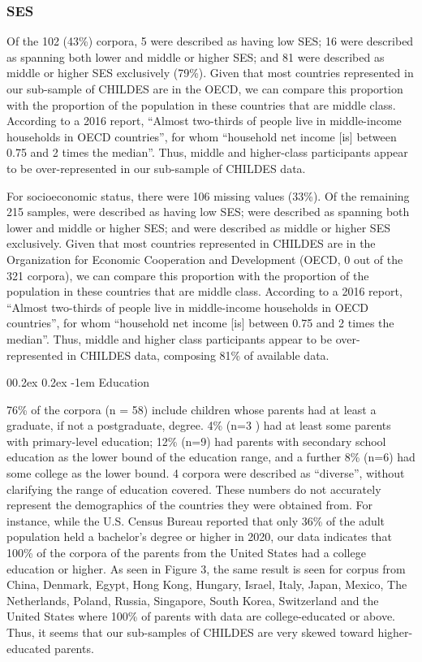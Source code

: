 \documentclass[
  man,floatsintext]{apa6}
\makeatletter
\let\oldparagraph\paragraph
\renewcommand{\paragraph}[1]{\oldparagraph{#1}\mbox{}}
\renewcommand{\paragraph}{\@startsection{paragraph}{4}{\parindent}%
  {0\baselineskip \@plus 0.2ex \@minus 0.2ex}%
  {-1em}%
  {\normalfont\normalsize\bfseries\itshape\typesectitle}}
\makeatother
\begin{document}
\hypertarget{ses}{%
\subsubsection{SES}\label{ses}}

Of the 102 (43\%) corpora, 5 were described as having low SES; 16 were described as spanning both lower and middle or higher SES; and 81 were described as middle or higher SES exclusively (79\%). Given that most countries represented in our sub-sample of CHILDES are in the OECD, we can compare this proportion with the proportion of the population in these countries that are middle class. According to a 2016 report, ``Almost two-thirds of people live in middle-income households in OECD countries'', for whom ``household net income {[}is{]} between 0.75 and 2 times the median''. Thus, middle and higher-class participants appear to be over-represented in our sub-sample of CHILDES data.

For socioeconomic status, there were 106 missing values (33\%). Of the remaining 215 samples, were described as having low SES; were described as spanning both lower and middle or higher SES; and were described as middle or higher SES exclusively. Given that most countries represented in CHILDES are in the Organization for Economic Cooperation and Development (OECD, 0 out of the 321 corpora), we can compare this proportion with the proportion of the population in these countries that are middle class. According to a 2016 report, ``Almost two-thirds of people live in middle-income households in OECD countries'', for whom ``household net income {[}is{]} between 0.75 and 2 times the median''. Thus, middle and higher class participants appear to be over-represented in CHILDES data, composing 81\% of available data.

\hypertarget{education}{%
\paragraph{Education}\label{education}}

76\% of the corpora (n = 58) include children whose parents had at least a graduate, if not a postgraduate, degree. 4\% (n=3 ) had at least some parents with primary-level education; 12\% (n=9) had parents with secondary school education as the lower bound of the education range, and a further 8\% (n=6) had some college as the lower bound. 4 corpora were described as ``diverse'', without clarifying the range of education covered. These numbers do not accurately represent the demographics of the countries they were obtained from. For instance, while the U.S. Census Bureau reported that only 36\% of the adult population held a bachelor's degree or higher in 2020, our data indicates that 100\% of the corpora of the parents from the United States had a college education or higher. As seen in Figure 3, the same result is seen for corpus from China, Denmark, Egypt, Hong Kong, Hungary, Israel, Italy, Japan, Mexico, The Netherlands, Poland, Russia, Singapore, South Korea, Switzerland and the United States where 100\% of parents with data are college-educated or above. Thus, it seems that our sub-samples of CHILDES are very skewed toward higher-educated parents.
\end{document}
